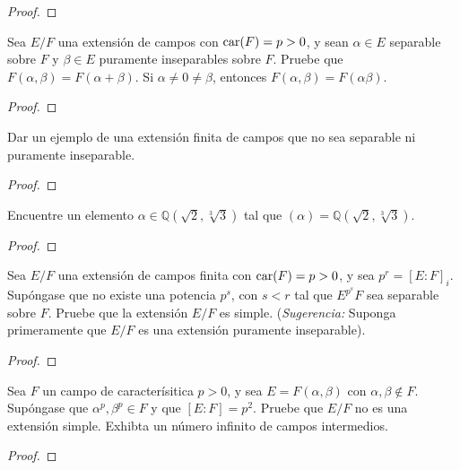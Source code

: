 \documentclass[12pt]{report}
\theoremstyle{largebreak}
\newcommand{\car}[1]{\ensuremath{\textup{car}(#1)}}
\begin{document}
    \begin{proof}
        
    \end{proof}

    \begin{excer}
        Sea $E/F$ una extensión de campos con $\car{F}=p>0$, y sean $\alpha\in E$ separable sobre $F$ y $\beta\in E$ puramente inseparables sobre $F$. Pruebe que $F(\alpha,\beta)=F(\alpha+\beta)$. Si $\alpha\neq0\neq\beta$, entonces $F(\alpha,\beta)=F(\alpha\beta)$.
    \end{excer}

    \begin{proof}
        
    \end{proof}

    \begin{excer}
        Dar un ejemplo de una extensión finita de campos que no sea separable ni puramente inseparable.
    \end{excer}

    \begin{proof}
        
    \end{proof}

    \begin{excer}
        Encuentre un elemento $\alpha\in\mathbb{Q}(\sqrt{2},\sqrt[3]{3})$ tal que $(\alpha)=\mathbb{Q}(\sqrt{2},\sqrt[3]{3})$.
    \end{excer}

    \begin{proof}
        
    \end{proof}

    \begin{excer}
        Sea $E/F$ una extensión de campos finita con $\car{F}=p>0$, y sea $p^r=\left[E:F\right]_i$. Supóngase que no existe una potencia $p^s$, con $s<r$ tal que $E^{p^s}F$ sea separable sobre $F$. Pruebe que la extensión $E/F$ es simple. (\textit{Sugerencia: }Suponga primeramente que $E/F$ es una extensión puramente inseparable).
    \end{excer}

    \begin{proof}
        
    \end{proof}

    \begin{excer}
        Sea $F$ un campo de caracterísitica $p>0$, y sea $E=F(\alpha,\beta)$ con $\alpha,\beta\notin F$. Supóngase que $\alpha^p,\beta^p\in F$ y que $[E:F]=p^2$. Pruebe que $E/F$ no es una extensión simple. Exhibta un número infinito de campos intermedios.
    \end{excer}

    \begin{proof}
        
    \end{proof}
\end{document}
